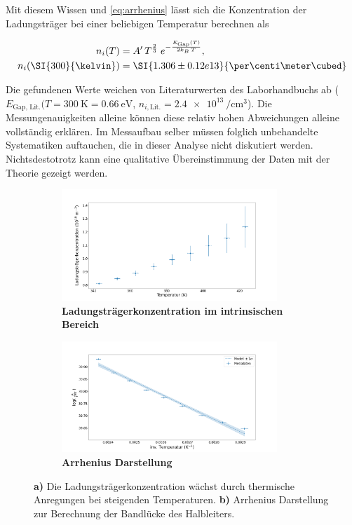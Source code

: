 Mit diesem Wissen und \autoref{eq:arrhenius} lässt sich die Konzentration der
Ladungsträger bei einer beliebigen Temperatur berechnen als

\begin{align*}
\label{eq:charge-carrier-concentration}
	n_i(T) &= A'\,T^{\frac{2}{3}}\;e^{-\frac{E_\text{Gap}(T)}{2k_B\,T}}, \\
	n_i(\SI{300}{\kelvin}) &= \SI{1.306\pm0.12e13}{\per\centi\meter\cubed}
\end{align*}

Die gefundenen Werte weichen von Literaturwerten des Laborhandbuchs ab 
($E_\text{Gap, Lit.}(T=\SI{300}{\kelvin}=\SI{0.66}{\electronvolt}$, 
$n_{i,\text{Lit.}}=\SI{2.4e13}{\per\centi\meter\cubed}$). Die Messungenauigkeiten
alleine können diese relativ hohen Abweichungen alleine vollständig erklären. Im 
Messaufbau selber müssen folglich unbehandelte Systematiken auftauchen, die in dieser
Analyse nicht diskutiert werden. Nichtsdestotrotz kann  eine qualitative
Übereinstimmung der Daten mit der Theorie gezeigt werden.

\begin{figure}
	\centering
	\begin{subfigure}[h]{0.45\linewidth}
	\includegraphics[height=4.2cm]{./fig/charge_carrier_concentration.png}
	\caption{\textbf{Ladungsträgerkonzentration im intrinsischen Bereich}\label{fig:charge-carrier-concentration}}
	\end{subfigure}
	\hfill
	\begin{subfigure}[h]{0.45\linewidth}
	\includegraphics[height=4.2cm]{./fig/arrhenius_plot.png}
	\caption{\textbf{Arrhenius Darstellung}\label{fig:arrhenius}}
	\end{subfigure}
	\caption*{\textbf{a)} Die Ladungsträgerkonzentration wächst durch thermische 
	Anregungen bei steigenden Temperaturen. \textbf{b)} Arrhenius Darstellung zur
	Berechnung der Bandlücke des Halbleiters. \label{fig:analysis_A}}
\end{figure}
